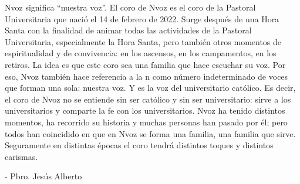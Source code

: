 Nvoz significa ``nuestra voz''. El coro de Nvoz es el coro de la Pastoral Universitaria que nació el 14 de febrero de 2022. Surge después de una Hora Santa con la finalidad de animar todas las actividades de la Pastoral Universitaria, especialmente la Hora Santa, pero también otros momentos de espiritualidad y de convivencia: en los ascensos, en los campamentos, en los retiros. La idea es que este coro sea una familia que hace escuchar su voz. Por eso, Nvoz también hace referencia a la n como número indeterminado de voces que forman una sola: nuestra voz. Y es la voz del universitario católico. Es decir, el coro de Nvoz no se entiende sin ser católico y sin ser universitario: sirve a los universitarios y comparte la fe con los universitarios. Nvoz ha tenido distintos momentos, ha recorrido su historia y muchas personas han pasado por él; pero todos han coincidido en que en Nvoz se forma una familia, una familia que sirve. Seguramente en distintas épocas el coro tendrá distintos toques y distintos carismas.

- Pbro. Jesús Alberto